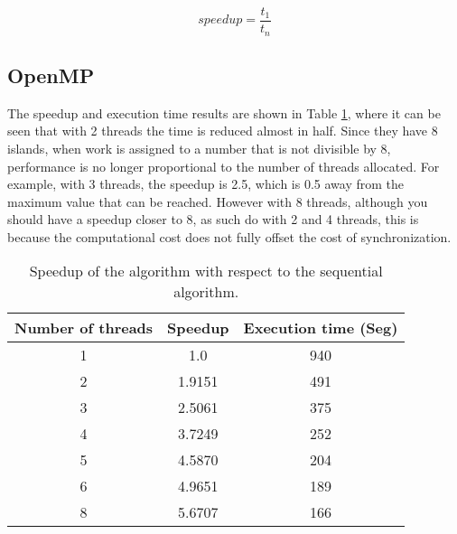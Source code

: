 \documentclass{IEEEtran}
\begin{document}
\begin{equation}
  \label{eq:speedup}
  speedup = \frac{t_{1}}{t_{n}}
\end{equation}


\subsection{OpenMP}

The speedup and execution time results are shown in Table \ref{tab:openmp}, where it can be seen that with 2 threads the time is reduced almost in half. Since they have 8 islands, when work is assigned to a number that is not divisible by 8, performance is no longer proportional to the number of threads allocated. For example, with 3 threads, the speedup is 2.5, which is 0.5 away from the maximum value that can be reached. However with 8 threads, although you should have a speedup closer to 8, as such do with 2 and 4 threads, this is because the computational cost does not fully offset the cost of synchronization.


\begin{table}[h]
  \centering
  \begin{tabular}{|c|c|c|}
    \hline
    \textbf{Number of threads} & \textbf{Speedup} & \textbf{Execution time (Seg)} \\ \hline
    1                          & 1.0              & 940                           \\
    2                          & 1.9151           & 491                           \\
    3                          & 2.5061           & 375                           \\
    4                          & 3.7249           & 252                           \\
    5                          & 4.5870           & 204                           \\
    6                          & 4.9651           & 189                           \\
    8                          & 5.6707           & 166                           \\ \hline
  \end{tabular}
  \caption{Speedup of the algorithm with respect to the sequential algorithm.}
  \label{tab:openmp}
\end{table}
\end{document}
